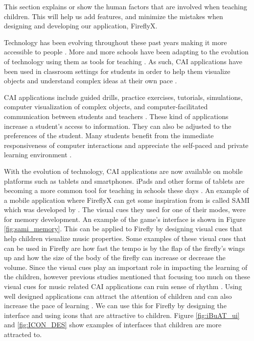 This section explains or show the human factors that are involved when teaching children. This will help us add features, and minimize the mistakes when designing and developing our application, FireflyX.

Technology has been evolving throughout these past years making it more accessible to people \cite{czaja2007impact}. More and more schools have been adapting to the evolution of technology using them as tools for teaching \cite{aqda2011comparative}. As such, CAI applications have been used in classroom settings for students in order to help them visualize objects and understand complex ideas at their own pace \cite{arnold1997computer}. 

CAI applications include guided drills, practice exercises, tutorials, simulations, computer visualization of complex objects, and computer-facilitated communication between students and teachers \cite{arnold1997computer, christmann2000comparative}. These kind of applications increase a student's access to information. They can also be adjusted to the preferences of the student. Many students benefit from the immediate responsiveness of
computer interactions and appreciate the self-paced and private
learning environment \cite{arnold1997computer}.

With the evolution of technology, CAI applications are now available on mobile platforms such as tablets and smartphones. iPads and other forms of tablets are becoming a more common tool for teaching in schools these days \cite{papadakis2017mobile}. An example of a mobile application where FireflyX can get some inspiration from is called SAMI which was developed by . The visual cues they used for one of their modes, were for memory development. An example of the game's interface is shown in Figure \ref{fig:sami_memory}. This can be applied to Firefly by designing visual cues that help children visualize music properties. Some examples of these visual cues that can be used in Firefly are how fast the tempo is by the flap of the firefly's wings up and how the size of the body of the firefly can increase or decrease the volume. Since the visual cues play an important role in impacting the learning of the children, however previous studies mentioned that focusing too much on these visual cues for music related CAI applications can ruin sense of rhythm  \cite{pennycook1985computer, chung2017designing}. Using well designed applications can attract the attention of children \cite{chung2017designing} and can also increase the pace of learning \cite{cohen2011young}. We can use this for Firefly by designing the interface and using icons that are attractive to children. Figure \ref{fig:iBuAT_ui} and \ref{fig:ICON_DES} show examples of interfaces that children are more attracted to.



